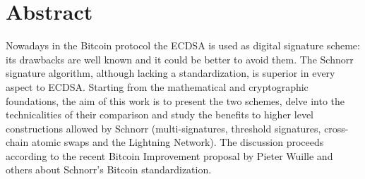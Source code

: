 \chapter{Abstract}
\label{chpr:abstract}
Nowadays in the Bitcoin protocol the ECDSA is used as digital signature scheme: its drawbacks are well known and it could be better to avoid them. The Schnorr signature algorithm, although lacking a standardization, is superior in every aspect to ECDSA. Starting from the mathematical and cryptographic foundations, the aim of this work is to present the two schemes, delve into the technicalities of their comparison and study the benefits to higher level constructions allowed by Schnorr (multi-signatures, threshold signatures, cross-chain atomic swaps and the Lightning Network). The discussion proceeds according to the recent Bitcoin Improvement proposal by Pieter Wuille and others about Schnorr's Bitcoin standardization.